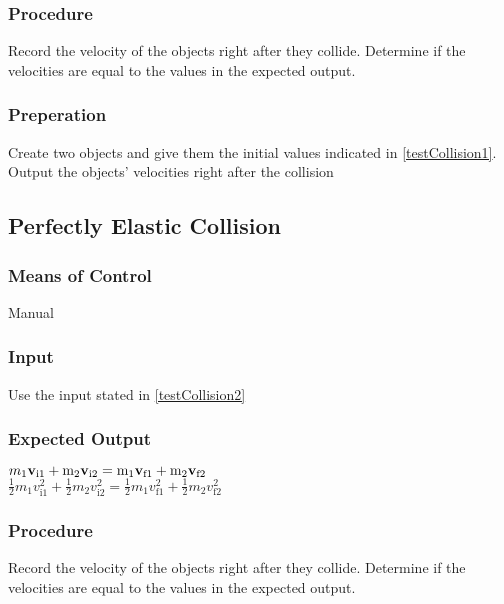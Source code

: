 \documentclass[12pt]{article}
\begin{document}
\subsubsection{Procedure}
Record the velocity of the objects right after they collide. Determine if the 
velocities are equal to the values in the expected output.  

\subsubsection{Preperation}
Create two objects and give them the initial values indicated in \ref{testCollision1}.
Output the objects' velocities right after the collision


\subsection{Perfectly Elastic Collision}
\subsubsection{Means of Control}
Manual
\subsubsection{Input}
Use the input stated in \ref{testCollision2}

\subsubsection{Expected Output}

$m_\text{1}\bf{v}_\text{i1} + \textnormal{m}_\text{2}\bf{v}_\text{i2}=\textnormal{m}_\text{1}\bf{v}_\text{f1} + \textnormal{m}_\text{2}\bf{v}_\text{f2}$\\
\noindent
$\frac{1}{2}m_\text{1}v_\text{i1}^{2} + \frac{1}{2}m_\text{2}v_\text{i2}^{2} =  \frac{1}{2}m_\text{1}v_\text{f1}^{2} + \frac{1}{2}m_\text{2}v_\text{f2}^{2} $\\

\subsubsection{Procedure}
Record the velocity of the objects right after they collide. Determine if the 
velocities are equal to the values in the expected output.  
\end{document}

